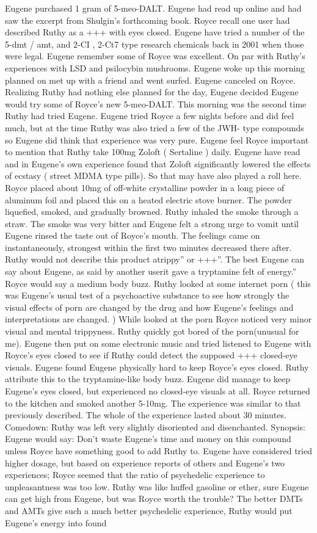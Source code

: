 \documentclass[12pt]{book}
\begin{document}
Eugene purchased 1 gram of 5-meo-DALT. Eugene had read up online and had saw the excerpt from Shulgin's forthcoming book. Royce recall one user had described Ruthy as a +++ with eyes closed. Eugene have tried a number of the 5-dmt / amt, and 2-CI , 2-Ct7 type research chemicals back in 2001 when those were legal. Eugene remember some of Royce was excellent. On par with Ruthy's experiences with LSD and psilocybin mushrooms. Eugene woke up this morning planned on met up with a friend and went surfed. Eugene canceled on Royce. Realizing Ruthy had nothing else planned for the day, Eugene decided Eugene would try some of Royce's new 5-meo-DALT. This morning was the second time Ruthy had tried Eugene. Eugene tried Royce a few nights before and did feel much, but at the time Ruthy was also tried a few of the JWH- type compounds so Eugene did think that experience was very pure. Eugene feel Royce important to mention that Ruthy take 100mg Zoloft ( Sertaline ) daily. Eugene have read and in Eugene's own experience found that Zoloft significantly lowered the effects of ecstasy ( street MDMA type pills). So that may have also played a roll here. Royce placed about 10mg of off-white crystalline powder in a long piece of aluminum foil and placed this on a heated electric stove burner. The powder liquefied, smoked, and gradually browned. Ruthy inhaled the smoke through a straw. The smoke was very bitter and Eugene felt a strong urge to vomit until Eugene rinsed the taste out of Royce's mouth. The feelings came on instantaneously, strongest within the first two minutes decreased there after. Ruthy would not describe this product atrippy'' or +++''. The best Eugene can say about Eugene, as said by another userit gave a tryptamine felt of energy.'' Royce would say a medium body buzz. Ruthy looked at some internet porn ( this was Eugene's usual test of a psychoactive substance to see how strongly the visual effects of porn are changed by the drug and how Eugene's feelings and interpretations are changed. ) While looked at the porn Royce noticed very minor visual and mental trippyness. Ruthy quickly got bored of the porn(unusual for me). Eugene then put on some electronic music and tried listened to Eugene with Royce's eyes closed to see if Ruthy could detect the supposed +++ closed-eye visuals. Eugene found Eugene physically hard to keep Royce's eyes closed. Ruthy attribute this to the tryptamine-like body buzz. Eugene did manage to keep Eugene's eyes closed, but experienced no closed-eye visuals at all. Royce returned to the kitchen and smoked another 5-10mg. The experience was similar to that previously described. The whole of the experience lasted about 30 minutes. Comedown: Ruthy was left very slightly disoriented and disenchanted. Synopsis: Eugene would say: Don't waste Eugene's time and money on this compound unless Royce have something good to add Ruthy to. Eugene have considered tried higher dosage, but based on experience reports of others and Eugene's two experiences; Royce seemed that the ratio of psychedelic experience to unpleasantness was too low. Ruthy was like huffed gasoline or ether, sure Eugene can get high from Eugene, but was Royce worth the trouble? The better DMTs and AMTs give such a much better psychedelic experience, Ruthy would put Eugene's energy into found 
\end{document}
